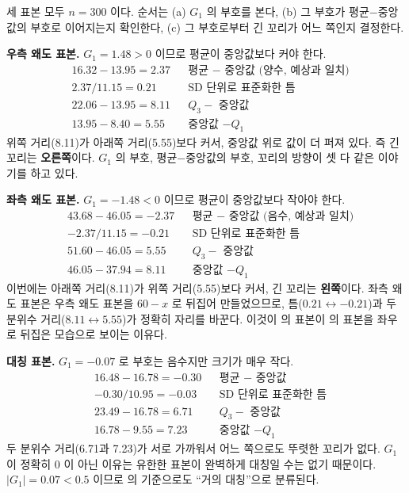 \begin{example}
\label{ex:skew-three-cases}
세 표본 모두 $n=300$ 이다. 순서는 (a) $G_1$ 의 부호를 본다, (b) 그 부호가
평균$-$중앙값의 부호로 이어지는지 확인한다, (c) 그 부호로부터 긴 꼬리가 어느
쪽인지 결정한다.

\textbf{우측 왜도 표본.} $G_1 = 1.48 > 0$ 이므로 평균이 중앙값보다 커야 한다.
\begin{align*}
  &16.32 - 13.95 = 2.37       && \text{평균 $-$ 중앙값 (양수, 예상과 일치)}\\
  &2.37 / 11.15 = 0.21        && \text{SD 단위로 표준화한 틈}\\
  &22.06 - 13.95 = 8.11       && \text{$Q_3 - $ 중앙값}\\
  &13.95 - 8.40 = 5.55        && \text{중앙값 $- Q_1$}
\end{align*}
위쪽 거리(8.11)가 아래쪽 거리(5.55)보다 커서, 중앙값 위로 값이 더 퍼져 있다.
즉 긴 꼬리는 \textbf{오른쪽}이다. $G_1$ 의 부호, 평균$-$중앙값의 부호, 꼬리의
방향이 셋 다 같은 이야기를 하고 있다.

\textbf{좌측 왜도 표본.} $G_1 = -1.48 < 0$ 이므로 평균이 중앙값보다 작아야 한다.
\begin{align*}
  &43.68 - 46.05 = -2.37      && \text{평균 $-$ 중앙값 (음수, 예상과 일치)}\\
  &-2.37 / 11.15 = -0.21      && \text{SD 단위로 표준화한 틈}\\
  &51.60 - 46.05 = 5.55       && \text{$Q_3 - $ 중앙값}\\
  &46.05 - 37.94 = 8.11       && \text{중앙값 $- Q_1$}
\end{align*}
이번에는 아래쪽 거리(8.11)가 위쪽 거리(5.55)보다 커서, 긴 꼬리는
\textbf{왼쪽}이다. 좌측 왜도 표본은 우측 왜도 표본을 $60-x$ 로 뒤집어 만들었으므로,
틈($0.21 \leftrightarrow -0.21$)과 두 분위수 거리($8.11 \leftrightarrow 5.55$)가
정확히 자리를 바꾼다. 이것이 의 표본이 의 표본을
좌우로 뒤집은 모습으로 보이는 이유다.

\textbf{대칭 표본.} $G_1 = -0.07$ 로 부호는 음수지만 크기가 매우 작다.
\begin{align*}
  &16.48 - 16.78 = -0.30      && \text{평균 $-$ 중앙값}\\
  &-0.30 / 10.95 = -0.03      && \text{SD 단위로 표준화한 틈}\\
  &23.49 - 16.78 = 6.71       && \text{$Q_3 - $ 중앙값}\\
  &16.78 - 9.55 = 7.23        && \text{중앙값 $- Q_1$}
\end{align*}
두 분위수 거리(6.71과 7.23)가 서로 가까워서 어느 쪽으로도 뚜렷한 꼬리가
없다. $G_1$ 이 정확히 $0$ 이 아닌 이유는 유한한 표본이 완벽하게 대칭일 수는
없기 때문이다. $|G_1|=0.07 < 0.5$ 이므로 의 기준으로도
``거의 대칭''으로 분류된다.
\end{example}

